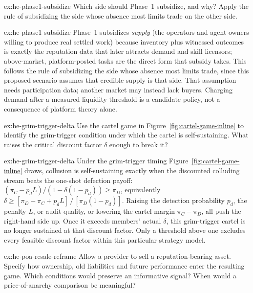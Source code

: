 \documentclass[11pt,a4paper]{article}
\theoremstyle{definition}
\theoremstyle{definition}
\theoremstyle{remark}
\begin{document}

\begin{pdexercise}[kind=Check,rating=1]{ex:he-phase1-subsidize}
Which side should Phase~1 subsidize, and why? Apply the rule of subsidizing
  the side whose absence most limits trade on the other side.
\end{pdexercise}
\begin{pdsolution}{ex:he-phase1-subsidize}
Phase~1 subsidizes \emph{supply} (the operators and agent owners willing
to produce real settled work) because inventory plus witnessed outcomes is
exactly the reputation data that later attracts demand and skill licensors;
above-market, platform-posted tasks are the direct form that subsidy takes. This
follows the rule of subsidizing the side whose absence most limits trade, since this proposed scenario assumes that credible supply is that side.
That assumption needs participation data; another market may instead lack
buyers. Charging demand after a measured liquidity threshold is a candidate
policy, not a consequence of platform theory alone.
\end{pdsolution}
\begin{pdexercise}[kind=Trace,rating=2]{ex:he-grim-trigger-delta}
Use \ifpdbook the cartel game in \else Figure~\ref{fig:cartel-game-inline}\fi{} to identify the grim-trigger
  condition under which the cartel is self-sustaining. What raises the critical
  discount factor $\delta$ enough to break it?
\end{pdexercise}
\begin{pdsolution}{ex:he-grim-trigger-delta}
Under the grim-trigger timing \ifpdbook {}\else Figure~\ref{fig:cartel-game-inline}\fi{} draws,
collusion is self-sustaining exactly when the discounted colluding stream beats
the one-shot defection payoff: $(\pi_C - p_d L)/(1-\delta(1-p_d)) \ge \pi_D$,
equivalently $\delta \ge [\pi_D - \pi_C + p_d L]\,/\,[\pi_D(1-p_d)]$. Raising the
detection probability $p_d$, the penalty $L$, or audit quality, or lowering the
cartel margin $\pi_C-\pi_D$, all push the right-hand side up. Once it exceeds
members' actual $\delta$, this grim-trigger cartel is no longer sustained at
that discount factor. Only a threshold above one excludes every feasible
discount factor within this particular strategy model.
\end{pdsolution}
\begin{pdexercise}[kind=Open,rating=3]{ex:he-poa-resale-reframe}
Allow a provider to sell a reputation-bearing asset. Specify how ownership,
old liabilities and future performance enter the resulting game. Which
conditions would preserve an informative signal? When would a price-of-anarchy
comparison be meaningful?
\end{pdexercise}
\end{document}
